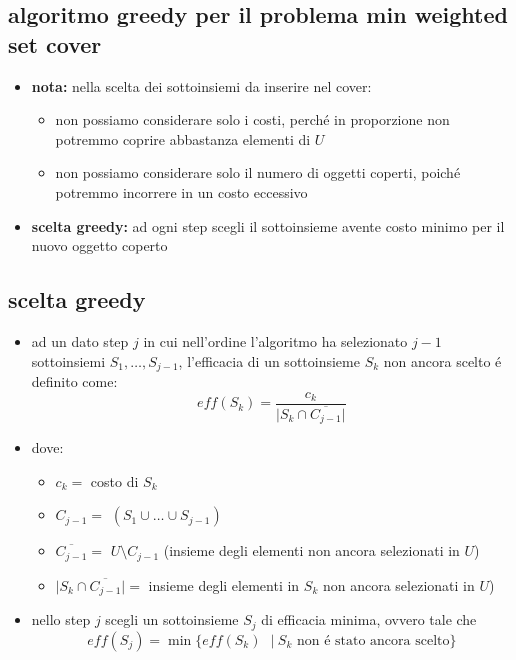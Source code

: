 \subsection*{algoritmo greedy per il problema min weighted set cover}
\begin{flushleft}
	\begin{itemize}
		\item \textbf{nota:} nella scelta dei sottoinsiemi da inserire nel cover:
		\begin{itemize}
			\item non possiamo considerare solo i costi, perch\'e in proporzione non potremmo coprire abbastanza elementi di $U$
			\item non possiamo considerare solo il numero di oggetti coperti, poich\'e potremmo incorrere in un costo eccessivo
		\end{itemize}
		\item \textbf{scelta greedy:} ad ogni step scegli il sottoinsieme avente costo minimo per il nuovo oggetto coperto
	\end{itemize}
\end{flushleft}


\subsection*{scelta greedy}
\begin{flushleft}
	\begin{itemize}
		\item ad un dato step $j$ in cui nell'ordine l'algoritmo ha selezionato $j-1$ sottoinsiemi $S_1,\ldots,S_{j-1}$, l'efficacia di un sottoinsieme $S_k$ non ancora scelto \'e definito come:
			$$eff(S_k)=\frac{c_k}{\vert S_k\cap\overline{C_{j-1}}\vert}$$
		\item dove:
		\begin{itemize}
			\item $c_k=$ costo di $S_k$
			\item $C_{j-1}=$ $(S_1\cup\ldots\cup S_{j-1})$
			\item $\overline{C_{j-1}}=$ $U\setminus C_{j-1}$ (insieme degli elementi non ancora selezionati in $U$)
			\item $\vert S_k\cap\overline{C_{j-1}}\vert=$ insieme degli elementi in $S_k$ non ancora selezionati in $U$)
		\end{itemize}
		\item nello step $j$ scegli un sottoinsieme $S_j$ di efficacia minima, ovvero tale che
			$$eff(S_j)=\min\{eff(S_k)\text{ }\vert\ S_k \text{ non \'e stato ancora scelto}\}$$
	\end{itemize}
\end{flushleft}

